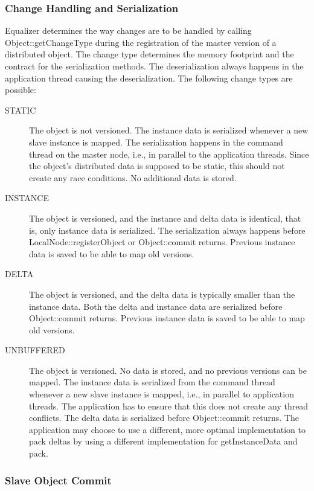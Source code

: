 \documentclass[10pt,a4]{scrartcl}
\begin{document}
\subsubsection{Change Handling and Serialization}

Equalizer determines the way changes are to be handled by calling
\textsf{Object::get\-Change\-Type} during the registration of the master version
of a distributed object. The change type determines the memory footprint and the
contract for the serialization methods. The deserialization always happens in
the application thread causing the deserialization. The following change types
are possible:

\begin{description}
  \item[STATIC] The object is not versioned. The instance data is serialized
    whenever a new slave instance is mapped. The serialization happens in the
    command thread on the master node, i.e., in parallel to the application
    threads. Since the object's distributed data is supposed to be static, this
    should not create any race conditions. No additional data is stored.
  \item[INSTANCE] The object is versioned, and the instance and delta data is
    identical, that is, only instance data is serialized. The serialization
    always happens before \textsf{LocalNode::registerObject} or
    \textsf{Object::commit} returns. Previous instance data is saved to be able
    to map old versions.
  \item[DELTA] The object is versioned, and the delta data is typically smaller
    than the instance data. Both the delta and instance data are serialized
    before \textsf{Object::commit} returns. Previous instance data is saved to
    be able to map old versions.
  \item[UNBUFFERED] The object is versioned. No data is stored, and no previous
    versions can be mapped. The instance data is serialized from the command
    thread whenever a new slave instance is mapped, i.e., in parallel to
    application threads. The application has to ensure that this does not create
    any thread conflicts. The delta data is serialized before
    \textsf{Object::commit} returns. The application may choose to use a
    different, more optimal implementation to pack deltas by using a different
    implementation for \textsf{getInstanceData} and \textsf{pack}.
\end{description}


\subsubsection{\label{sSlaveCommit}Slave Object Commit}
\end{document}

